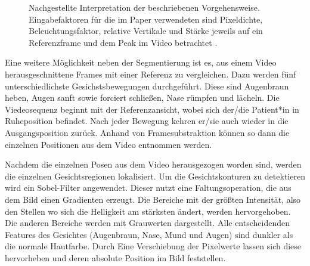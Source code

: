 \begin{figure}[!t]
\caption[Nachgestellte Interpretation der beschriebenen Vorgehensweise für]{Nachgestellte Interpretation der beschriebenen Vorgehensweise. Eingabefaktoren für die im Paper verwendeten sind Pixeldichte, Beleuchtungsfaktor, relative Vertikale und Stärke jeweils auf ein Referenzframe und dem Peak im Video betrachtet \cite{detection_fp1}.}\label{cap:paper_2}
\end{figure}\label{fig:paper_2}


Eine weitere Möglichkeit neben der Segmentierung ist es, aus einem Video herausgeschnittene Frames mit einer Referenz zu vergleichen. Dazu werden fünf unterschiedlichste Gesichstsbewegungen durchgeführt. Diese sind Augenbraun heben, Augen sanft sowie forciert schließen, Nase rümpfen und lächeln. Die Viedeosequenz beginnt mit der Referenzansicht, wobei sich der/die Patient*in in Ruheposition befindet. Nach jeder Bewegung kehren er/sie auch wieder in die Ausgangsposition zurück. Anhand von Framesubstraktion können so dann die einzelnen Positionen aus dem Video entnommen werden.

Nachdem die einzelnen Posen aus dem Video herausgezogen worden sind, werden die einzelnen Gesichtsregionen lokalisiert. Um die Gesichtskonturen zu detektieren wird ein Sobel-Filter angewendet. Dieser nutzt eine Faltungsoperation, die aus dem Bild einen Gradienten erzeugt. Die Bereiche mit der größten Intensität, also den Stellen wo sich die Helligkeit am stärksten ändert, werden hervorgehoben. Die anderen Bereiche werden mit Grauwerten dargestellt. Alle entscheidenden Features des Gesichtes (Augenbraun, Nase, Mund und Augen) sind dunkler als die normale Hautfarbe. Durch Eine Verschiebung der Pixelwerte lassen sich diese hervorheben und deren absolute Position im Bild feststellen.

